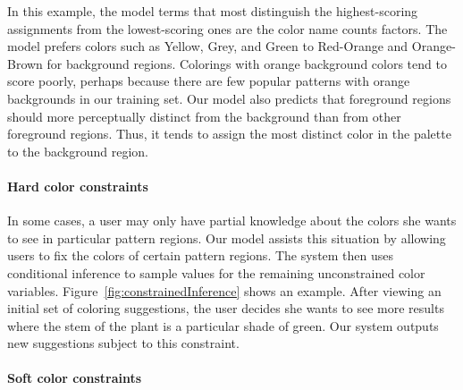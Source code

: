 In this example, the model terms that most distinguish the highest-scoring assignments from the lowest-scoring ones are the color name counts factors. The model prefers colors such as Yellow, Grey, and Green to Red-Orange and Orange-Brown for background regions. Colorings with orange background colors tend to score poorly, perhaps because there are few popular patterns with orange backgrounds in our training set.
Our model also predicts that foreground regions should more perceptually distinct from the background than from other foreground regions. Thus, it tends to assign the most distinct color in the palette to the background region.


\paragraph{Hard color constraints}

In some cases, a user may only have partial knowledge about the colors she wants to see in particular pattern regions. Our model assists this situation by allowing users to fix the colors of certain pattern regions. The system then uses conditional inference to sample values for the remaining unconstrained color variables. Figure~\ref{fig:constrainedInference} shows an example. After viewing an initial set of coloring suggestions, the user decides she wants to see more results where the stem of the plant is a particular shade of green. Our system outputs new suggestions subject to this constraint.~

\paragraph{Soft color constraints}

